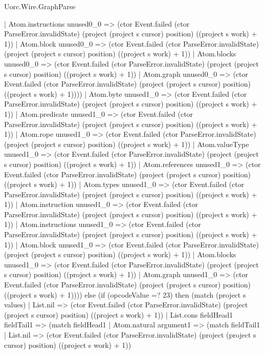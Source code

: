 \begin{lexlean}{Uorc.Wire.GraphParse}
\begin{semanticmodule}
{              | Atom.instructions unused0_0 => (ctor Event.failed (ctor ParseError.invalidState) (project (project s cursor) position) ((project s work) + 1))
              | Atom.block unused0_0 => (ctor Event.failed (ctor ParseError.invalidState) (project (project s cursor) position) ((project s work) + 1))
              | Atom.blocks unused0_0 => (ctor Event.failed (ctor ParseError.invalidState) (project (project s cursor) position) ((project s work) + 1))
              | Atom.graph unused0_0 => (ctor Event.failed (ctor ParseError.invalidState) (project (project s cursor) position) ((project s work) + 1))))
          | Atom.byte unused1_0 => (ctor Event.failed (ctor ParseError.invalidState) (project (project s cursor) position) ((project s work) + 1))
          | Atom.predicate unused1_0 => (ctor Event.failed (ctor ParseError.invalidState) (project (project s cursor) position) ((project s work) + 1))
          | Atom.rope unused1_0 => (ctor Event.failed (ctor ParseError.invalidState) (project (project s cursor) position) ((project s work) + 1))
          | Atom.valueType unused1_0 => (ctor Event.failed (ctor ParseError.invalidState) (project (project s cursor) position) ((project s work) + 1))
          | Atom.references unused1_0 => (ctor Event.failed (ctor ParseError.invalidState) (project (project s cursor) position) ((project s work) + 1))
          | Atom.types unused1_0 => (ctor Event.failed (ctor ParseError.invalidState) (project (project s cursor) position) ((project s work) + 1))
          | Atom.instruction unused1_0 => (ctor Event.failed (ctor ParseError.invalidState) (project (project s cursor) position) ((project s work) + 1))
          | Atom.instructions unused1_0 => (ctor Event.failed (ctor ParseError.invalidState) (project (project s cursor) position) ((project s work) + 1))
          | Atom.block unused1_0 => (ctor Event.failed (ctor ParseError.invalidState) (project (project s cursor) position) ((project s work) + 1))
          | Atom.blocks unused1_0 => (ctor Event.failed (ctor ParseError.invalidState) (project (project s cursor) position) ((project s work) + 1))
          | Atom.graph unused1_0 => (ctor Event.failed (ctor ParseError.invalidState) (project (project s cursor) position) ((project s work) + 1)))) else (if (opcodeValue =? 23) then (match (project s values)
        | List.nil => (ctor Event.failed (ctor ParseError.invalidState) (project (project s cursor) position) ((project s work) + 1))
        | List.cons fieldHead1 fieldTail1 => (match fieldHead1
          | Atom.natural argument1 => (match fieldTail1
            | List.nil => (ctor Event.failed (ctor ParseError.invalidState) (project (project s cursor) position) ((project s work) + 1))
}
\end{semanticmodule}
\end{lexlean}
